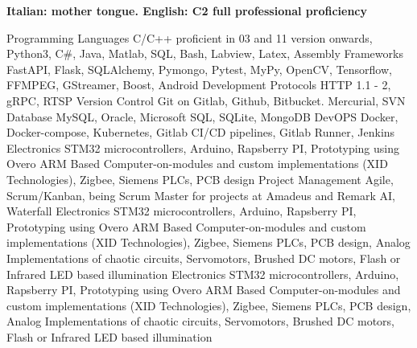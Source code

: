 \begin{cvskills}
    \cvskill
    {} %
    {\textbf{Italian: mother tongue.
     English: C2 full professional proficiency}} %
\end{cvskills}




\begin{cvskills}

\cvskill
    {Programming Languages} %
    {C/C++ proficient in 03 and 11 version onwards, Python3, C\#, Java, Matlab, SQL, Bash, Labview, Latex, Assembly} %
\cvskill
    {Frameworks} %
    {FastAPI, Flask, SQLAlchemy, Pymongo, Pytest, MyPy, OpenCV, Tensorflow, FFMPEG, GStreamer, Boost, Android Development} %
\cvskill
    {Protocols} %
    {HTTP 1.1 - 2, gRPC, RTSP} %
\cvskill
    {Version Control} %
    {Git on Gitlab, Github, Bitbucket. Mercurial, SVN} %
\cvskill
    {Database} %
    {MySQL, Oracle, Microsoft SQL, SQLite, MongoDB} %
\cvskill
    {DevOPS} %
    {Docker, Docker-compose, Kubernetes, Gitlab CI/CD pipelines, Gitlab Runner, Jenkins} %
\cvskill
    {Electronics} %
    {STM32 microcontrollers, Arduino, Rapsberry PI, Prototyping using Overo ARM Based Computer-on-modules and custom implementations (XID Technologies),
     Zigbee, Siemens PLCs, PCB design} %
\cvskill
    {Project Management} %
    {Agile, Scrum/Kanban, being Scrum Master for projects at Amadeus and Remark AI, Waterfall} %
\cvskill
    {Electronics} %
    {STM32 microcontrollers, Arduino, Rapsberry PI, Prototyping using Overo ARM Based Computer-on-modules and custom implementations (XID Technologies),
     Zigbee, Siemens PLCs, PCB design, Analog Implementations of chaotic circuits, Servomotors, Brushed DC motors, Flash or Infrared LED based illumination} %
\cvskill
     {Electronics} %
     {STM32 microcontrollers, Arduino, Rapsberry PI, Prototyping using Overo ARM Based Computer-on-modules and custom implementations (XID Technologies),
      Zigbee, Siemens PLCs, PCB design, Analog Implementations of chaotic circuits, Servomotors, Brushed DC motors, Flash or Infrared LED based illumination} %

\end{cvskills}
